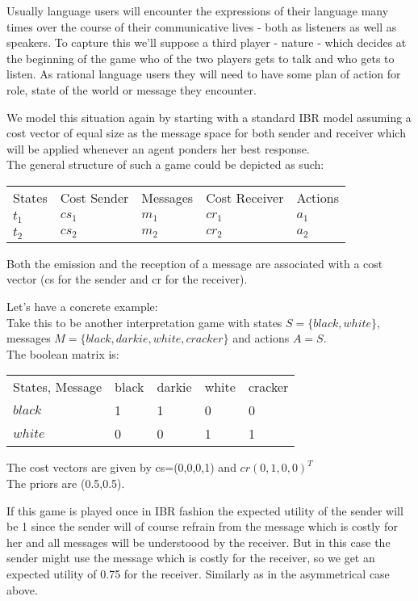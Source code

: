 \documentclass{article}
\begin{document}
Usually language users will encounter the expressions of their language many times over the course of their communicative lives - both as listeners as well as speakers. To capture this we'll suppose a third player - nature - which decides at the beginning of the game who of the two players gets to talk and who gets to listen. As rational language users they will need to have some plan of action for role, state of the world or message they encounter.

We model this situation again by starting with a standard IBR model assuming a cost vector of equal size as the message space for both sender and receiver which will be applied whenever an agent ponders her best response. \\
The general structure of such a game could be depicted as such:
\begin{table}[h]
\centering
\begin{tabular}{lllll}
States & Cost Sender & Messages & Cost Receiver & Actions \\
$t_1$  & $cs_1$      & $m_1$    & $cr_1$        & $a_1$   \\
$t_2$  & $cs_2$      & $m_2$    & $cr_2$        & $a_2$  
\end{tabular}
\end{table}
Both the emission and the reception of a message are associated with a cost vector (cs for the sender and cr for the receiver).

Let's have a concrete example:\\
Take this to be another interpretation game with states $S=\{black, white\}$, messages $M=\{black,darkie,white,cracker\}$ and actions $A=S$.\\
The boolean matrix is:

\begin{table}[h]
\centering
\begin{tabular}{lllll}
States, Message & black & darkie & white & cracker \\
$black$  & 1      & 1    & 0        & 0   \\
$white$  & 0     & 0   & 1       & 1 
\end{tabular}
\end{table}

The cost vectors are given by 
cs=(0,0,0,1) and $cr(0,1,0,0)^T$\\
The priors are (0.5,0.5).

If this game is played once in IBR fashion the expected utility of the sender will be 1 since the sender will of course refrain from the message which is costly for her and all messages will be understoood by the receiver. But in this case the sender might use the message which is costly for the receiver, so we get an expected utility of 0.75 for the receiver. Similarly as in the asymmetrical case above.
\end{document}
